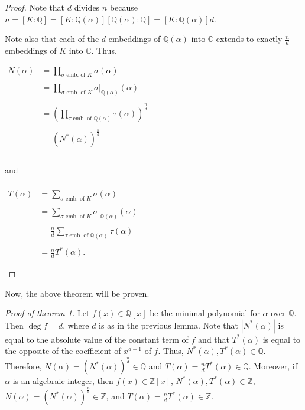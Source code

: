 \documentclass[12pt]{article}
\begin{document}
\begin{proof}
Note that $d$ divides $n$ because $n=[K\!:\!\mathbb{Q}]=[K\!:\!\mathbb{Q}(\alpha)][\mathbb{Q}(\alpha)\!:\!\mathbb{Q}]=[K\!:\!\mathbb{Q}(\alpha)]d$.

Note also that each of the $d$ embeddings of $\mathbb{Q}(\alpha)$ into $\mathbb{C}$ extends to exactly $\displaystyle \frac{n}{d}$ embeddings of $K$ into $\mathbb{C}$.  Thus,

\begin{center}
$\begin{array}{ll}
\displaystyle N(\alpha) & \displaystyle =\prod_{\sigma \text{ emb. of }K} \sigma(\alpha) \\
\\
& \displaystyle =\prod_{\sigma \text{ emb. of }K} \left. \sigma \right|_{\mathbb{Q}(\alpha)} (\alpha) \\
\\
& \displaystyle =\left( \prod_{\tau \text{ emb. of }\mathbb{Q}(\alpha)} \tau(\alpha) \right)^{\frac{n}{d}} \\
\\
& \displaystyle =\left(N^*(\alpha) \right)^{\frac{n}{d}} \\
\\
\end{array}$
\end{center}

and

\begin{center}
$\begin{array}{ll}
\\
\displaystyle T(\alpha) & \displaystyle =\sum_{\sigma \text{ emb. of }K} \sigma(\alpha) \\
\\
& \displaystyle =\sum_{\sigma \text{ emb. of }K} \left. \sigma \right|_{\mathbb{Q}(\alpha)} (\alpha) \\
\\
& \displaystyle =\frac{n}{d} \sum_{\tau \text{ emb. of }\mathbb{Q}(\alpha)} \tau(\alpha) \\
\\
& \displaystyle =\frac{n}{d} T^*(\alpha). \end{array}$
\end{center}

\end{proof}

Now, the above theorem will be proven.

\emph{Proof of theorem 1.}  Let $f(x) \in \mathbb{Q}[x]$ be the minimal polynomial for $\alpha$ over $\mathbb{Q}$.  Then $\operatorname{deg} f=d$, where $d$ is as in the previous lemma.  Note that $|N^*(\alpha)|$ is equal to the absolute value of the constant term of $f$ and that $T^*(\alpha)$ is equal to the opposite of the coefficient of $x^{d-1}$ of $f$.  Thus, $N^*(\alpha), T^*(\alpha) \in \mathbb{Q}$.  Therefore, $\displaystyle N(\alpha)=(N^*(\alpha))^{\frac{n}{d}} \in \mathbb{Q}$ and $\displaystyle T(\alpha)=\frac{n}{d}T^*(\alpha) \in \mathbb{Q}$.  Moreover, if $\alpha$ is an algebraic integer, then $f(x) \in \mathbb{Z}[x]$, $N^*(\alpha), T^*(\alpha) \in \mathbb{Z}$, $\displaystyle N(\alpha)=(N^*(\alpha))^{\frac{n}{d}} \in \mathbb{Z}$, and $\displaystyle T(\alpha)=\frac{n}{d}T^*(\alpha) \in \mathbb{Z}$.
\end{document}
